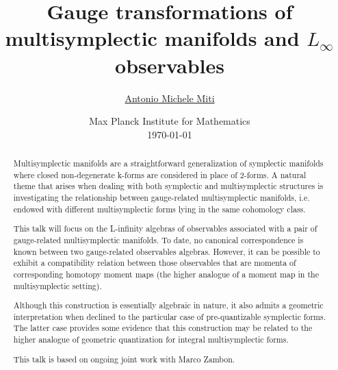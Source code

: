 \documentclass[10pt,a4paper]{article}
\title{
Gauge transformations of multisymplectic manifolds and $L_\infty$ observables
}
\author{\href{https://dmf.unicatt.it/miti/}{Antonio Michele Miti}}
\date{
	Max Planck Institute for Mathematics
	\\[.2em]
	\today
}
\begin{document}
\maketitle
\begin{abstract}
Multisymplectic manifolds are a straightforward generalization of symplectic manifolds where closed non-degenerate k-forms are considered in place of 2-forms.
A natural theme that arises when dealing with both symplectic and multisymplectic structures is investigating the relationship between gauge-related multisymplectic manifolds, i.e. endowed with different multisymplectic forms lying in the same cohomology class.

This talk will focus on the L-infinity algebras of observables associated with a pair of gauge-related multisymplectic manifolds.
To date, no canonical correspondence is known between two gauge-related observables algebras.
However, it can be possible to exhibit a compatibility relation between those observables that are momenta of corresponding homotopy moment maps (the higher analogue of a moment map in the multisymplectic setting).

Although this construction is essentially algebraic in nature, it also admits a geometric interpretation when declined to the particular case of pre-quantizable symplectic forms. The latter case provides some evidence that this construction may be related to the higher analogue of geometric quantization for integral multisymplectic forms.

This talk is based on ongoing joint work with Marco Zambon.
\end{abstract}
\end{document}
